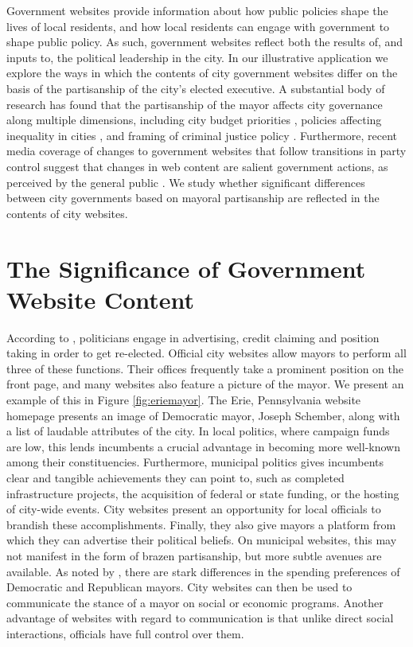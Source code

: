 \documentclass[11pt]{article}
\begin{document}
Government websites provide information about how public policies shape the lives of local residents, and how local residents can engage with government to shape public policy. As such, government websites reflect both the results of, and inputs to, the political leadership in the city. In our illustrative application we explore the ways in which the contents of city government websites differ on the basis of the partisanship of the city's elected executive. A substantial body of research has found that the partisanship of the mayor affects city governance along multiple dimensions, including city budget priorities \citep{de2016mayoral}, policies affecting inequality in cities \citep{einstein2016mayors}, and framing of criminal justice policy \citep{marion2013mayor}. Furthermore, recent media coverage of changes to government websites that follow transitions in party control suggest that changes in web content are salient government actions, as perceived by the general public \citep{sharfstein2017science,kirby2017trump,duarte2017deniable} . We study whether significant differences between city governments based on mayoral partisanship are reflected in the contents of city websites.


\section{The Significance of Government Website Content}


 According to \cite{Mayhew1974}, politicians engage in advertising, credit claiming and position taking in order to get re-elected. Official city websites allow mayors to perform all three of these functions. Their offices frequently take a prominent position on the front page, and many websites also feature a picture of the mayor. We present an example of this in Figure \ref{fig:eriemayor}. The Erie, Pennsylvania website homepage presents an image of Democratic mayor, Joseph Schember, along with a list of laudable attributes of the city. In local politics, where campaign funds are low, this lends incumbents a crucial advantage in becoming more well-known among their constituencies. Furthermore, municipal politics gives incumbents clear and tangible achievements they can point to, such as completed infrastructure projects, the acquisition of federal or state funding, or the hosting of city-wide events. City websites present an opportunity for local officials to brandish these accomplishments. Finally, they also give mayors a platform from which they can advertise their political beliefs. On municipal websites, this may not manifest in the form of brazen partisanship, but more subtle avenues are available. As noted by \cite{einstein2016mayors}, there are stark differences in the spending preferences of Democratic and Republican mayors. City websites can then be used to communicate the stance of a mayor on social or economic programs. Another advantage of websites with regard to communication is that unlike direct social interactions, officials have full control over them.
 
\end{document}
